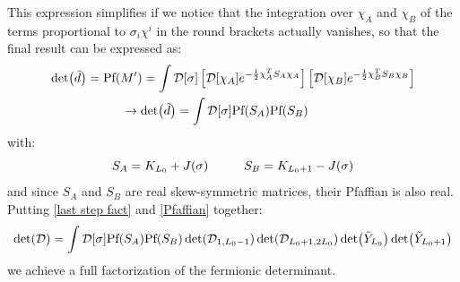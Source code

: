 This expression simplifies if we notice that the integration over $\chi_A$ and $\chi_B$ of the terms proportional to $\sigma_i \chi^i$ in the round brackets actually vanishes, so that the final result can be expressed as:
\begin{equation}\label{Pfaffian}
\begin{split}
        \det (\Tilde{d}) = \textrm{Pf}(M') = \int \mathcal{D}[\sigma] \left[\mathcal{D}[\chi_A] e^{-\frac{1}{2}\chi_A^T S_A \chi_A} \right] \left[\mathcal{D}[\chi_B] e^{-\frac{1}{2}\chi_B^T S_B \chi_B} \right] \\
        \rightarrow \det(\Tilde{d}) = \int \mathcal{D}[\sigma] \textrm{Pf}(S_A)\textrm{Pf}(S_B) \hspace{30mm}
\end{split}
\end{equation}
with:
\begin{equation}
    S_A = K_{L_0} + J(\sigma) \hspace{10mm} S_B = K_{L_0 + 1} - J(\sigma)
\end{equation}
and since $S_A$ and $S_B$ are real skew-symmetric matrices, their Pfaffian is also real.
\\ Putting \eqref{last step fact} and \eqref{Pfaffian} together:
\begin{equation}\label{Final Pfaffian}
    \det(\mathcal{D}) = \int \mathcal{D}[\sigma] \textrm{Pf}(S_A)\textrm{Pf}(S_B) \det(\mathcal{D}_{1, L_0 - 1}) \det(\mathcal{D}_{L_0 + 1, 2L_0}) \det(\Tilde{Y}_{L_0})  \det(\Tilde{Y}_{L_0 + 1})
\end{equation}
we achieve a full factorization of the fermionic determinant.

